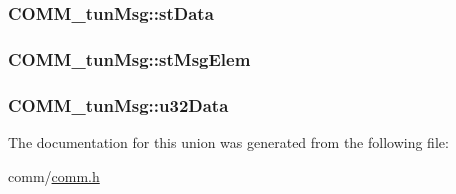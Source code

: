 \subsubsection[{st\+Data}]{ C\+O\+M\+M\+\_\+tun\+Msg\+::st\+Data}\label{union_c_o_m_m__tun_msg_a6ec6ef686a3615469f06d6b3ae131669}
\hypertarget{union_c_o_m_m__tun_msg_a821f70b6f4a12cf465c9cc55a9dcd5c7}{}
\subsubsection[{st\+Msg\+Elem}]{ C\+O\+M\+M\+\_\+tun\+Msg\+::st\+Msg\+Elem}\label{union_c_o_m_m__tun_msg_a821f70b6f4a12cf465c9cc55a9dcd5c7}
\hypertarget{union_c_o_m_m__tun_msg_af5dd90de47a4a2f46a8936275d6ca8e5}{}
\subsubsection[{u32\+Data}]{ C\+O\+M\+M\+\_\+tun\+Msg\+::u32\+Data}\label{union_c_o_m_m__tun_msg_af5dd90de47a4a2f46a8936275d6ca8e5}


The documentation for this union was generated from the following file\+:\begin{DoxyCompactItemize}
\item 
comm/\hyperlink{comm_8h}{comm.\+h}\end{DoxyCompactItemize}
